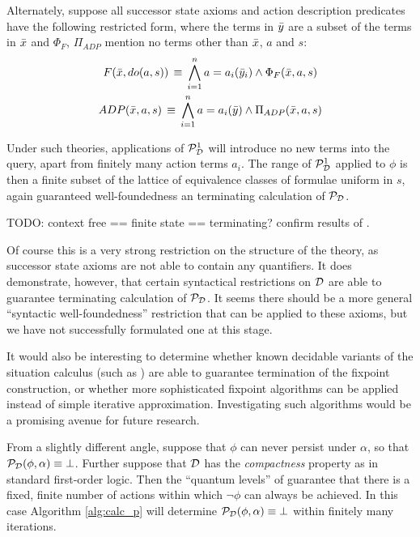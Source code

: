 Alternately, suppose all successor state axioms and action description
predicates have the following restricted form, where the terms in
$\bar{y}$ are a subset of the terms in $\bar{x}$ and $\Phi_{F}$,
$\Pi_{ADP}$ mention no terms other than $\bar{x}$, $a$ and $s$:\begin{gather*}
F(\bar{x},do(a,s))\,\equiv\,\bigwedge_{i=1}^{n}a=a_{i}(\bar{y}_{i})\wedge\Phi_{F}(\bar{x},a,s)\\
ADP(\bar{x},a,s)\,\equiv\,\bigwedge_{i=1}^{n}a=a_{i}(\bar{y})\wedge\Pi_{ADP}(\bar{x},a,s)\end{gather*}


Under such theories, applications of $\mathcal{P}^{1}_{\mathcal{D}}$ will introduce no new
terms into the query, apart from finitely many action terms $a_{i}$.
The range of $\mathcal{P}^{1}_{\mathcal{D}}$ applied to $\phi$ is then a finite subset
of the lattice of equivalence classes of formulae uniform in $s$,
again guaranteed well-foundedness an terminating calculation of $\mathcal{P}_{\mathcal{D}}$.

TODO: context free == finite state == terminating? confirm results
of \citet{levesque98what_robots_can_do}.

Of course this is a very strong restriction on the structure of the
theory, as successor state axioms are not able to contain any quantifiers.
It does demonstrate, however, that certain syntactical restrictions
on $\mathcal{D}$ are able to guarantee terminating calculation of $\mathcal{P}_{\mathcal{D}}$.
It seems there should be a more general {}``syntactic well-foundedness''
restriction that can be applied to these axioms, but we have not successfully
formulated one at this stage.

It would also be interesting to determine whether known decidable
variants of the situation calculus (such as \citep{yu07twovar_sitcalc})
are able to guarantee termination of the fixpoint construction, or
whether more sophisticated fixpoint algorithms can be applied instead
of simple iterative approximation. Investigating such algorithms would
be a promising avenue for future research.

From a slightly different angle, suppose that $\phi$ can never persist
under $\alpha$, so that $\mathcal{P}_{\mathcal{D}}(\phi,\alpha)\equiv\bot$. Further
suppose that $\mathcal{D}$ has the \emph{compactness} property as in standard
first-order logic. Then the {}``quantum levels'' of \citet{savelli06sc_quantum_levels}
guarantee that there is a fixed, finite number of actions within which
$\neg\phi$ can always be achieved. In this case Algorithm \ref{alg:calc_p}
will determine $\mathcal{P}_{\mathcal{D}}(\phi,\alpha)\equiv\bot$ within finitely many
iterations.

